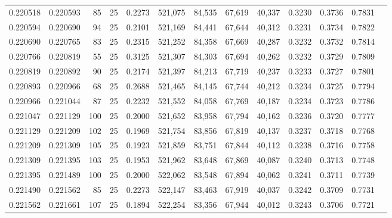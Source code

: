 \begin{tabular}{rrrrrrrrrrrrr}
0.220518 & 0.220593 &    85 &  25 &                                     0.2273 & 521,075 &  84,535 &  67,619 &  40,337 & 0.3230 & 0.3736 & 0.7831 \\
0.220594 & 0.220690 &    94 &  25 &                                     0.2101 & 521,169 &  84,441 &  67,644 &  40,312 & 0.3231 & 0.3734 & 0.7822 \\
0.220690 & 0.220765 &    83 &  25 &                                     0.2315 & 521,252 &  84,358 &  67,669 &  40,287 & 0.3232 & 0.3732 & 0.7814 \\
0.220766 & 0.220819 &    55 &  25 &                                     0.3125 & 521,307 &  84,303 &  67,694 &  40,262 & 0.3232 & 0.3729 & 0.7809 \\
0.220819 & 0.220892 &    90 &  25 &                                     0.2174 & 521,397 &  84,213 &  67,719 &  40,237 & 0.3233 & 0.3727 & 0.7801 \\
0.220893 & 0.220966 &    68 &  25 &                                     0.2688 & 521,465 &  84,145 &  67,744 &  40,212 & 0.3234 & 0.3725 & 0.7794 \\
0.220966 & 0.221044 &    87 &  25 &                                     0.2232 & 521,552 &  84,058 &  67,769 &  40,187 & 0.3234 & 0.3723 & 0.7786 \\
0.221047 & 0.221129 &   100 &  25 &                                     0.2000 & 521,652 &  83,958 &  67,794 &  40,162 & 0.3236 & 0.3720 & 0.7777 \\
0.221129 & 0.221209 &   102 &  25 &                                     0.1969 & 521,754 &  83,856 &  67,819 &  40,137 & 0.3237 & 0.3718 & 0.7768 \\
0.221209 & 0.221309 &   105 &  25 &                                     0.1923 & 521,859 &  83,751 &  67,844 &  40,112 & 0.3238 & 0.3716 & 0.7758 \\
0.221309 & 0.221395 &   103 &  25 &                                     0.1953 & 521,962 &  83,648 &  67,869 &  40,087 & 0.3240 & 0.3713 & 0.7748 \\
0.221395 & 0.221489 &   100 &  25 &                                     0.2000 & 522,062 &  83,548 &  67,894 &  40,062 & 0.3241 & 0.3711 & 0.7739 \\
0.221490 & 0.221562 &    85 &  25 &                                     0.2273 & 522,147 &  83,463 &  67,919 &  40,037 & 0.3242 & 0.3709 & 0.7731 \\
0.221562 & 0.221661 &   107 &  25 &                                     0.1894 & 522,254 &  83,356 &  67,944 &  40,012 & 0.3243 & 0.3706 & 0.7721 \\

\end{tabular}
